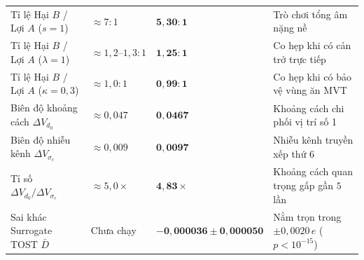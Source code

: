 \documentclass[11pt,a4paper]{report}
\begin{document}
\begin{table}[!htbp]
\begin{tabularx}{\textwidth}{@{}p{}p{}p{}>{\raggedright\arraybackslash}X@{}}
Tỉ lệ Hại $B$ / Lợi $A$ ($s=1$) & $\approx 7:1$ & $\mathbf{5{,}30 : 1}$ & Trò chơi tổng âm nặng nề \\
Tỉ lệ Hại $B$ / Lợi $A$ ($\lambda=1$) & $\approx 1{,}2\text{--}1{,}3:1$ & $\mathbf{1{,}25 : 1}$ & Co hẹp khi có cản trở trực tiếp \\
Tỉ lệ Hại $B$ / Lợi $A$ ($\kappa=0{,}3$) & $\approx 1{,}0:1$ & $\mathbf{0{,}99 : 1}$ & Co hẹp khi có bảo vệ vùng ăn MVT \\
Biên độ khoảng cách $\Delta V_{d_0}$ & $\approx 0{,}047$ & $\mathbf{0{,}0467}$ & Khoảng cách chi phối vị trí số 1 \\
Biên độ nhiễu kênh $\Delta V_{\sigma_c}$ & $\approx 0{,}009$ & $\mathbf{0{,}0097}$ & Nhiễu kênh truyền xếp thứ 6 \\
Tỉ số $\Delta V_{d_0} / \Delta V_{\sigma_c}$ & $\approx 5{,}0\times$ & $\mathbf{4{,}83\times}$ & Khoảng cách quan trọng gấp gần $5$ lần \\
Sai khác Surrogate TOST $\bar{D}$ & Chưa chạy & $\mathbf{-0{,}000036 \pm 0{,}000050}$ & Nằm trọn trong $\pm 0{,}0020\,e$ ($p < 10^{-15}$) \\
\bottomrule
\end{tabularx}
\end{table}
\end{document}
